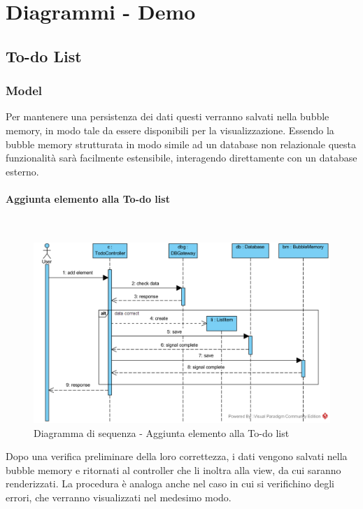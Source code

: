 \section{Diagrammi - Demo}

\subsection{To-do List}

\subsubsection{Model}
Per mantenere una persistenza dei dati questi verranno salvati nella bubble memory, in modo tale da essere disponibili per la visualizzazione. Essendo la bubble memory strutturata in modo simile ad un database non relazionale questa funzionalità sarà facilmente estensibile, interagendo direttamente con un database esterno.

\begin{samepage}
\paragraph{Aggiunta elemento alla To-do list}\mbox{}\\
\end{samepage}
\begin{figure}[H]
	\centering
	\includegraphics[width=15cm]{diagrammi_img/sequenza/todo_aggiungi_elemento.png}
	\caption{Diagramma di sequenza - Aggiunta elemento alla To-do list}
\end{figure}
Dopo una verifica preliminare della loro correttezza, i dati vengono salvati nella bubble memory e ritornati al controller che li inoltra alla view, da cui saranno renderizzati.
La procedura è analoga anche nel caso in cui si verifichino degli errori, che verranno visualizzati nel medesimo modo.

